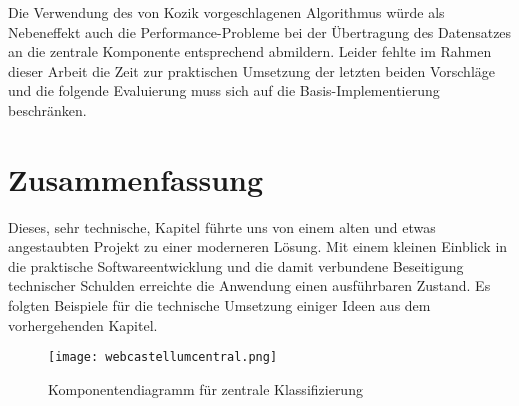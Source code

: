 Die Verwendung des von Kozik vorgeschlagenen Algorithmus würde als Nebeneffekt auch die Performance-Probleme bei der Übertragung des Datensatzes an die zentrale Komponente entsprechend abmildern. Leider fehlte im Rahmen dieser Arbeit die Zeit zur praktischen Umsetzung der letzten beiden Vorschläge und die folgende Evaluierung muss sich auf die Basis-Implementierung beschränken.



\section{Zusammenfassung}

Dieses, sehr technische, Kapitel führte uns von einem alten und etwas angestaubten Projekt zu einer moderneren Lösung. Mit einem kleinen Einblick in die praktische Softwareentwicklung und die damit verbundene Beseitigung technischer Schulden erreichte die Anwendung einen ausführbaren Zustand. Es folgten Beispiele für die technische Umsetzung einiger Ideen aus dem vorhergehenden Kapitel. 

\begin{figure}[h]
    \centering
    \texttt{[image: webcastellumcentral.png]}
    \caption{Komponentendiagramm für zentrale Klassifizierung}
    \label{fig:my_future}
\end{figure}

